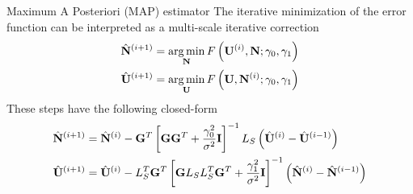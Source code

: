 {Maximum A Posteriori (MAP) estimator}
    The iterative minimization of the error function can be interpreted as a multi-scale iterative correction
    \begin{align}
        \hat{\mathbf{N}}^{(i+1)} &= \operatorname*{arg\,min}_{\mathbf{N}} F\left( \mathbf{U}^{(i)},\mathbf{N}; \gamma_0, \gamma_1 \right)
        \\
        \hat{\mathbf{U}}^{(i+1)} &= \operatorname*{arg\,min}_{\mathbf{U}} F\left( \mathbf{U},\mathbf{N}^{(i)}; \gamma_0, \gamma_1 \right)
    \end{align}
    These steps have the following closed-form
    \begin{align}
        \hat{\mathbf{N}}^{(i+1)} &=
        \hat{\mathbf{N}}^{(i)}
        -
        \mathbf{G}^T \left[ \mathbf{G} \mathbf{G}^T + \frac{\gamma_0^2}{\sigma^2} \mathbf{I} \right]^{-1} L_S \left( \hat{\mathbf{U}}^{(i)}-\hat{\mathbf{U}}^{(i-1)}  \right)
        \\
        \hat{\mathbf{U}}^{(i+1)} &=
        \hat{\mathbf{U}}^{(i)}
        -
        L_S^T \mathbf{G}^T \left[ \mathbf{G} L_S L_S^T \mathbf{G}^T + \frac{\gamma_1^2}{\sigma^2} \mathbf{I} \right]^{-1} \left( \hat{\mathbf{N}}^{(i)}-\hat{\mathbf{N}}^{(i-1)}  \right)
    \end{align}
 


